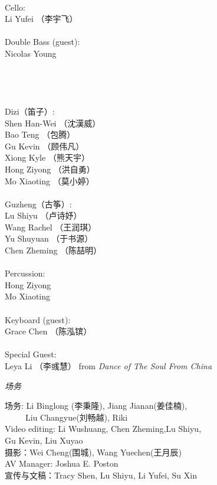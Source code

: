 \documentclass[letter,6pt,poets]{ConcProg}
\begin{document}
\begin{spacing}{1.0}
\begin{multicols}{2}
\\
Cello:\\
Li Yufei （李宇飞）\\
\\
Double Bass (guest):\\
Nicolas Young\\
\\
\\
\\
\\
Dizi（笛子）: 				 \\    
Shen Han-Wei		（沈漢威）     \\
Bao Teng  （包腾）\\
Gu Kevin   （顾伟凡）               \\
Xiong Kyle （熊天宇）\\
Hong Ziyong （洪自勇）\\
Mo Xiaoting （莫小婷）\\
\\
Guzheng（{古筝}）:\\
Lu Shiyu （卢诗妤）\\               
Wang Rachel （王润琪） \\
Yu Shuyuan   （于书源）\\
Chen Zheming  （陈喆明）\\
\\
Percussion:\\
Hong Ziyong \\
Mo Xiaoting \\
\\
Keyboard (guest):\\
Grace Chen （陈泓镔）
\\
\\
Special Guest:\\
Leya Li （李彧慧）
 \footnotesize{ from } \emph{ Dance of The Soul From China}
\\
\end{multicols}
\begin{center}
\Large\textsl{ 场务}
\end{center}
\begin{multicols}{2}%
场务: Li Binglong (李秉隆), Jiang Jianan(姜佳楠),\\\ \ \ \ \  Liu Changyue(刘畅越), Riki\\
 Video editing: Li Wushuang, Chen Zheming,Lu Shiyu,\\ Gu Kevin, Liu Xuyao\\
摄影：Wei Cheng(围城), Wang Yuechen(王月辰)\\
AV Manager: Joshua E. Poston\\
宣传与文稿：Tracy Shen, Lu Shiyu, Li Yufei, Su Xin



\end{multicols}
\end{spacing}
\end{document}
